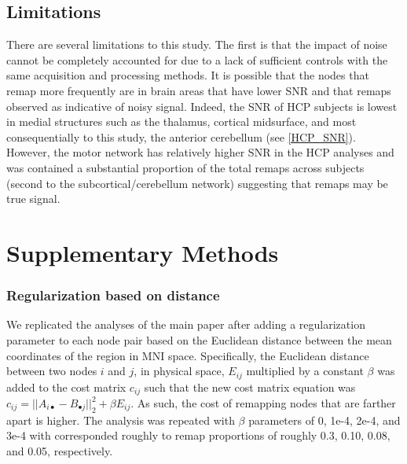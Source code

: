 \documentclass[10pt]{article}
\begin{document}
\subsection*{Limitations}
	There are several limitations to this study. The first is that the impact of noise cannot be completely accounted for due to a lack of sufficient controls with the same acquisition and processing methods. It is possible that the nodes that remap more frequently are in brain areas that have lower SNR and that remaps observed as indicative of noisy signal.  Indeed, the SNR of HCP subjects is lowest in medial structures such as the thalamus, cortical midsurface, and most consequentially to this study, the anterior cerebellum (see \ref{HCP_SNR}). However, the motor network has relatively higher SNR in the HCP analyses and was contained a substantial proportion of the total remaps across subjects (second to the subcortical/cerebellum network) suggesting that remaps may be true signal. 
	
	
	\newcommand{\beginsupplement}{%
		\setcounter{table}{0}
		\renewcommand{\thetable}{S\arabic{table}}%
		\setcounter{figure}{0}
		\renewcommand{\thefigure}{S\arabic{figure}}%
	}
	\beginsupplement
	
\section*{Supplementary Methods}
	
	\subsubsection*{Regularization based on distance}
	We replicated the analyses of the main paper after adding a regularization parameter to each node pair based on the Euclidean distance between the mean coordinates of the region in MNI space. Specifically, the Euclidean distance between two nodes $i$ and $j$, in physical space, $E_{ij}$ multiplied by a constant $\beta$ was added to the cost matrix $c_{ij} $ such that the new cost matrix equation was $c_{ij}=|| A_{i\bullet}-B_{\bullet j} ||^2_2 + \beta E_{ij}$. As such, the cost of remapping nodes that are farther apart is higher. The analysis was repeated with $\beta$ parameters of $0$, 1e-4, 2e-4, and 3e-4 with corresponded roughly to remap proportions of roughly 0.3, 0.10, 0.08, and 0.05, respectively.
	
\end{document}
